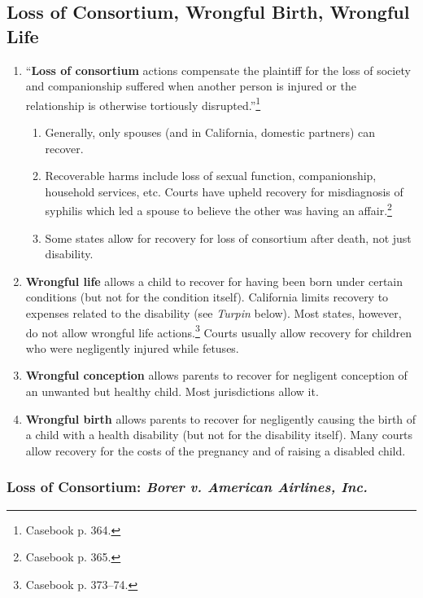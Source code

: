 \subsection{Loss of Consortium, Wrongful Birth, Wrongful Life}

\begin{enumerate}
    \item ``\textbf{Loss of consortium} actions compensate the plaintiff for 
    the loss of society and companionship suffered when another person is 
    injured or the relationship is otherwise tortiously 
    disrupted.''\footnote{Casebook p. 364.}
    \begin{enumerate}
        \item Generally, only spouses (and in California, domestic partners) 
        can recover.
        \item Recoverable harms include loss of sexual function, 
        companionship, household services, etc. Courts have upheld recovery 
        for misdiagnosis of syphilis which led a spouse to believe the other 
        was having an affair.\footnote{Casebook p. 365.}
        \item Some states allow for recovery for loss of consortium after 
        death, not just disability. 
    \end{enumerate}
    \item \textbf{Wrongful life} allows a child to recover for having been 
    born under certain conditions (but not for the condition itself). 
    California limits recovery to expenses related to the disability (see 
    \emph{Turpin} below). Most states, however, do not allow wrongful life 
    actions.\footnote{Casebook p. 373--74.} Courts usually allow recovery for 
    children who were negligently injured while fetuses.
    \item \textbf{Wrongful conception} allows parents to recover for negligent 
    conception of an unwanted but healthy child. Most jurisdictions allow it.
    \item \textbf{Wrongful birth} allows parents to recover for negligently 
    causing the birth of a child with a health disability (but not for the 
    disability itself). Many courts allow recovery for the costs of the 
    pregnancy and of raising a disabled child.
\end{enumerate}

\subsubsection{Loss of Consortium: \emph{Borer v. American 
Airlines, Inc.}}

